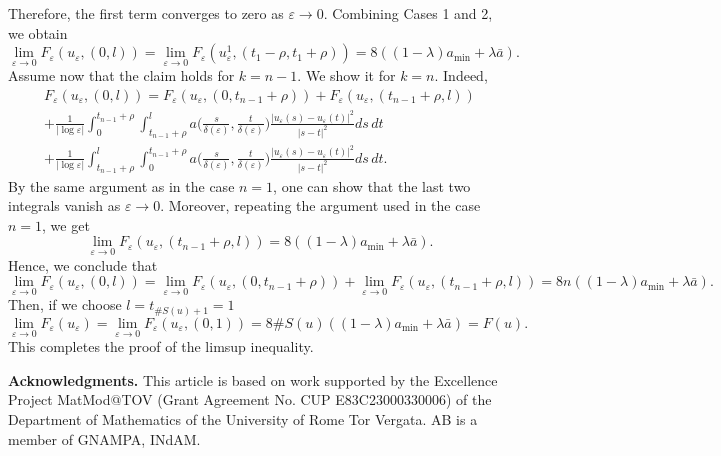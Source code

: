 \documentclass[12pt]{article}
\numberwithin{equation}{section}
\def\e{\varepsilon}
\begin{document}
Therefore, the first term converges to zero as $\varepsilon \to 0$. Combining Cases 1 and 2, we obtain
\[
 \lim_{\e\to0}F_{\varepsilon}(u_{\varepsilon},(0,l))=\lim_{\varepsilon\to0}F_{\varepsilon}(u^{1}_{\varepsilon},(t_{1}-\rho,t_{1}+\rho))=8((1-\lambda)a_{\min}+\lambda\bar{a}).
\]
Assume now that the claim holds for $k=n-1$. We show it for $k=n$. Indeed,
\begin{multline*}
     F_{\varepsilon}(u_{\varepsilon},(0,l))=F_{\varepsilon}(u_{\varepsilon},(0,t_{n-1}+\rho))+F_{\varepsilon}(u_{\varepsilon},(t_{n-1}+\rho,l))\\+\frac{1}{\left|\log{\e}\right|}\int_{0}^{t_{n-1}+\rho}\int_{t_{n-1}+\rho}^{l}a\big(\frac{s}{\delta(\e) },\frac{t}{\delta(\e) }\big)\frac{\left|u_{\e}(s)-u_{\e}(t)\right|^2}{\left|s-t\right|^2}ds\,dt\\+\frac{1}{\left|\log{\e}\right|}\int_{t_{n-1}+\rho}^{l}\int_{0}^{t_{n-1}+\rho}a\big(\frac{s}{\delta(\e) },\frac{t}{\delta(\e) }\big)\frac{\left|u_{\e}(s)-u_{\e}(t)\right|^2}{\left|s-t\right|^2}ds\,dt.
\end{multline*}
By the same argument as in the case $n=1$, one can show that the last two integrals vanish as $\varepsilon\to0$. Moreover, repeating the argument used in the case $n=1$, we get
\[
\lim_{\varepsilon\to0}F_{\varepsilon}(u_{\varepsilon},(t_{n-1}+\rho,l))=8((1-\lambda)a_{\min}+\lambda\bar{a}).
\]
Hence, we conclude that
\[
\lim_{\varepsilon\to0}F_{\varepsilon}(u_{\varepsilon},(0,l))=\lim_{\varepsilon\to0}F_{\varepsilon}(u_{\varepsilon},(0,t_{n-1}+\rho))+\lim_{\varepsilon\to0}F_{\varepsilon}(u_{\varepsilon},(t_{n-1}+\rho,l))=8n((1-\lambda)a_{\min}+\lambda\bar{a}).
\]
Then, if we choose $l=t_{\#S(u)+1}=1$
\[
\lim_{\varepsilon\to0}F_{\varepsilon}(u_{\varepsilon})=\lim_{\varepsilon\to0}F_{\varepsilon}(u_{\varepsilon},(0,1))=8\#S(u)((1-\lambda)a_{\min}+\lambda\bar{a})=F(u).
\]
This completes the proof of the limsup inequality.

\bigskip

\textbf{Acknowledgments.} This article is based on work supported by the Excellence Project MatMod@TOV (Grant Agreement No. CUP E83C23000330006) of the Department of Mathematics of the University of Rome Tor Vergata. AB is a member of GNAMPA, INdAM.

 

\end{document}
